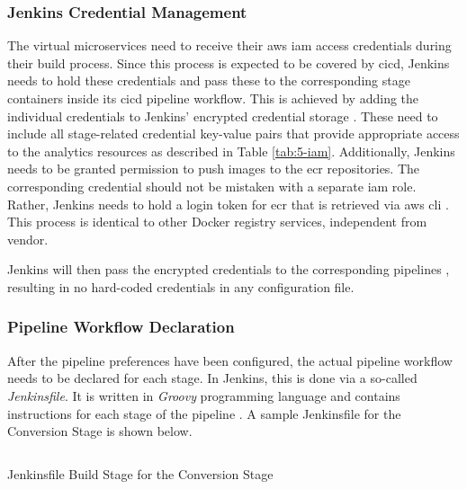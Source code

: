 \subsubsection{Jenkins Credential Management}
The virtual microservices need to receive their \ac{aws} \ac{iam} access credentials during their build process. Since this process is expected to be covered by \ac{cicd}, Jenkins needs to hold these credentials and pass these to the corresponding stage containers inside its \ac{cicd} pipeline workflow. This is achieved by adding the individual credentials to Jenkins' encrypted credential storage \cite{jenkins}. These need to include all stage-related credential key-value pairs that provide appropriate access to the analytics resources as described in Table \ref{tab:5-iam}. Additionally, Jenkins needs to be granted permission to push images to the \ac{ecr} repositories. The corresponding credential should not be mistaken with a separate \ac{iam} role. Rather, Jenkins needs to hold a login token for \ac{ecr} that is retrieved via \ac{aws} \acs{cli} \cite{ecr}. This process is identical to other Docker registry services, independent from vendor.

Jenkins will then pass the encrypted credentials to the corresponding pipelines \cite{ecr}, resulting in no hard-coded credentials in any configuration file.

\subsubsection{Pipeline Workflow Declaration}
After the pipeline preferences have been configured, the actual pipeline workflow needs to be declared for each stage. In Jenkins, this is done via a so-called \textit{Jenkinsfile}. It is written in \textit{Groovy} programming language and contains instructions for each stage of the pipeline \cite{jenkins}. A sample Jenkinsfile for the Conversion Stage is shown below.
\newpage
\begin{listing}[h!]
	\inputminted{groovy}{main-matter/src/5-jenkinsfile-build}
	\caption{Jenkinsfile Build Stage for the Conversion Stage}
	\label{src:5-jenkinsfile-build}
\end{listing}

